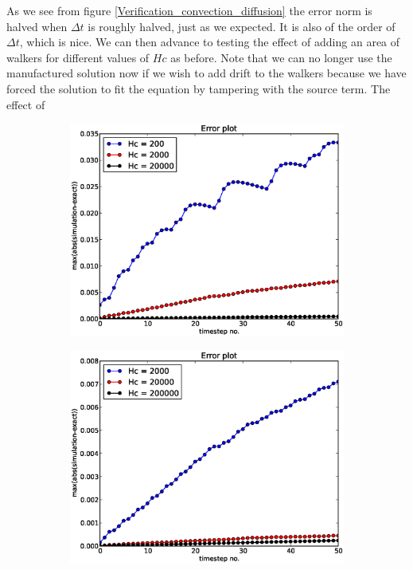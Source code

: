 As we see from figure \ref{Verification_convection_diffusion} the error norm is halved when $\Delta t$ is roughly halved, just as we expected. It is also of the order of $\Delta t$, which is nice.  
We can then advance to testing the effect of adding an area of walkers for different values of $Hc$ as before. 
Note that we can no longer use the manufactured solution now if we wish to add drift to the walkers because we have forced the solution to fit the equation by tampering with the source term. 
The effect of
\begin{figure}[H]
\centering
\begin{subfigure}[b]{0.48\textwidth}
\includegraphics[width=\textwidth]{../doc/results/experiment_05112013_1237/results/errorplot.eps}
\caption{}
\label{Errortest_convection_diffusion_walkers:few_walkers}
\end{subfigure}
\begin{subfigure}[b]{0.48\textwidth}
\includegraphics[width=\textwidth]{../doc/results/experiment_05112013_1239/results/errorplot.eps}

\end{subfigure}
\end{figure}
